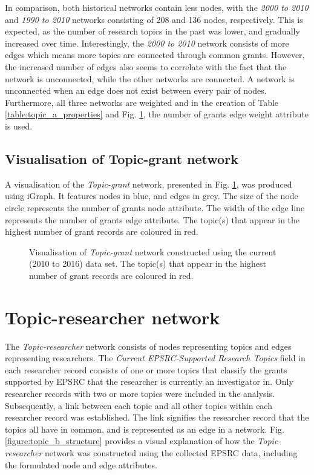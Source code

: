In comparison, both historical networks contain less nodes, with the \textit{2000 to 2010} and \textit{1990 to 2010} networks consisting of 208 and 136 nodes, respectively. This is expected, as the number of research topics in the past was lower, and gradually increased over time. Interestingly, the \textit{2000 to 2010} network consists of more edges which means more topics are connected through common grants. However, the increased number of edges also seems to correlate with the fact that the network is unconnected, while the other networks are connected. A network is unconnected when an edge does not exist between every pair of nodes. Furthermore, all three networks are weighted and in the creation of Table \ref{table:topic_a_properties} and Fig. \ref{figure:topic_a_current_vis}, the number of grants edge weight attribute is used.

\subsection{Visualisation of Topic-grant network}

A visualisation of the \textit{Topic-grant} network, presented in Fig. \ref{figure:topic_a_current_vis}, was produced using iGraph. It features nodes in blue, and edges in grey. The size of the node circle represents the number of grants node attribute. The width of the edge line represents the number of grants edge attribute. The topic(s) that appear in the highest number of grant records are coloured in red.

\begin{figure}[htpb]
    \centering
    \caption[Visualisation of \textit{Topic-grant} network constructed using the current (2010 to 2016) data set]{Visualisation of \textit{Topic-grant} network constructed using the current (2010 to 2016) data set. The topic(s) that appear in the highest number of grant records are coloured in red.}
    \label{figure:topic_a_current_vis}
\end{figure}

\section{Topic-researcher network}

The \textit{Topic-researcher} network consists of nodes representing topics and edges representing researchers. The \textit{Current EPSRC-Supported Research Topics} field in each researcher record consists of one or more topics that classify the grants supported by EPSRC that the researcher is currently an investigator in. Only researcher records with two or more topics were included in the analysis. Subsequently, a link between each topic and all other topics within each researcher record was established. The link signifies the researcher record that the topics all have in common, and is represented as an edge in a network. Fig. \ref{figure:topic_b_structure} provides a visual explanation of how the \textit{Topic-researcher} network was constructed using the collected EPSRC data, including the formulated node and edge attributes.

